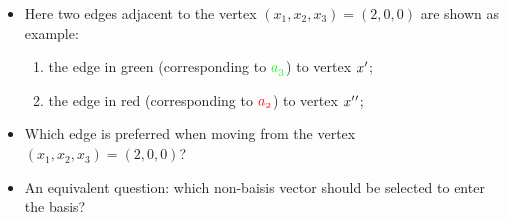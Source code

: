\documentclass[mathserif]{beamer}
\begin{document}
{\begin{itemize}
\begin{figure}
 \end{figure}
 \item Here  two edges adjacent to the vertex $(x_{1}, x_{2}, x_{3})=(2, 0, 0)$ are shown as example: 
 	\begin{enumerate}
		\item the edge in green (corresponding to  $\textcolor{green}{\mathnormal{a_3}}$) to vertex $\mathnormal{x'}$; 
		\item the edge in red (corresponding to $\textcolor{red}{\mathnormal{a_2}}$) to vertex $\mathnormal{x}{'}{'}$; 
	\end{enumerate} 
\item Which edge is preferred when moving from the vertex $(x_{1}, x_{2}, x_{3})=(2, 0, 0)$?
 \item An equivalent question: which non-baisis vector should be selected to enter the basis?
\end{itemize}
}
\end{document}
